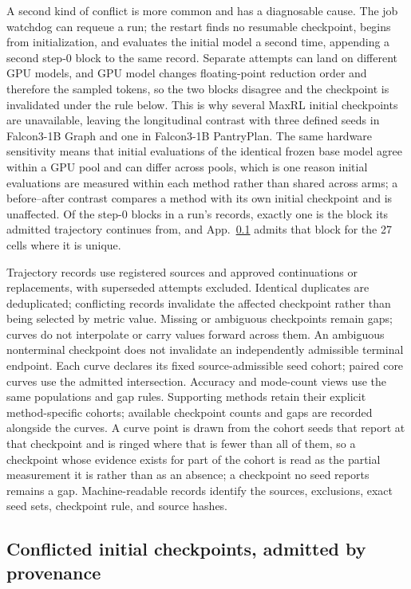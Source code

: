 \documentclass{article}
\newcommand{\1}{\mathbf 1}
\theoremstyle{remark}
\theoremstyle{definition}
\theoremstyle{plain}
\begin{document}
A second kind of conflict is more common and has a diagnosable cause. The job
watchdog can requeue a run; the restart finds no resumable checkpoint, begins
from initialization, and evaluates the initial model a second time, appending a
second step-0 block to the same record. Separate attempts can land on different
GPU models, and GPU model changes floating-point reduction order and therefore
the sampled tokens, so the two blocks disagree and the checkpoint is invalidated
under the rule below. This is why several MaxRL initial checkpoints are
unavailable, leaving the longitudinal contrast with three defined seeds in
Falcon3-1B Graph and one in Falcon3-1B PantryPlan. The same hardware
sensitivity means that initial evaluations of the identical frozen base model
agree within a GPU pool and can differ across pools, which is one reason
initial evaluations are measured within each method rather than shared across
arms; a before--after contrast compares a method with its own initial
checkpoint and is unaffected. Of the step-0 blocks in a run's records, exactly one is the block its admitted
trajectory continues from, and App.~\ref{app:initial-provenance} admits that
block for the 27 cells where it is unique.

Trajectory records use registered sources and approved continuations or
replacements, with superseded attempts excluded. Identical duplicates are
deduplicated; conflicting records invalidate the affected checkpoint rather
than being selected by metric value. Missing or ambiguous checkpoints remain gaps;
curves do not interpolate or carry values forward across them. An ambiguous
nonterminal checkpoint does not invalidate an independently admissible
terminal endpoint. Each curve declares its fixed source-admissible seed cohort; paired core
curves use the admitted intersection. Accuracy and mode-count views use
the same populations and gap rules. Supporting methods retain their
explicit method-specific cohorts; available checkpoint counts and gaps
are recorded alongside the curves. A curve point is drawn from the cohort seeds
that report at that checkpoint and is ringed where that is fewer than all of
them, so a checkpoint whose evidence exists for part of the cohort is read as
the partial measurement it is rather than as an absence; a checkpoint no seed
reports remains a gap. Machine-readable records identify the
sources, exclusions, exact seed sets, checkpoint rule, and source hashes.

\subsection{Conflicted initial checkpoints, admitted by provenance}
\label{app:initial-provenance}
\end{document}
